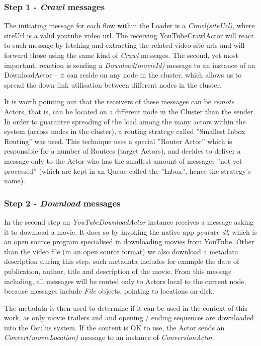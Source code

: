 \subsubsection{Step 1 - \textit{Crawl} messages}
The initiating message for each flow within the Loader is a \textit{Crawl(siteUrl)}, where siteUrl is a valid youtube video url.
The receiving YouTubeCrawlActor will react to such message by fetching and extracting the related video site urls and will forward those using the same kind of \textit{Crawl} messages. The second, yet most important, reaction is sending a \textit{Download(movieId)} message to an instance of an DownloadActor -- it  can reside on any node in the cluster, which allows us to spread the down-link utilisation between different nodes in the cluster.

It is worth pointing out that the receivers of these messages can be \textit{remote} Actors, that is, can be located on a different node in the Cluster than the sender. In order to guarantee spreading of the load among the many actors within the system (across nodes in the cluster), a routing strategy called ''Smallest Inbox Routing'' was used. This technique uses a special ''Router Actor'' which is responsible for a number of Routees (target Actors), and decides to deliver a message only to the Actor who has the smallest amount of messages ''not yet processed'' (which are kept in an Queue called the ''Inbox'', hence the strategy's name).

\subsubsection{Step 2 - \textit{Download} messages}
In the second step an \textit{YouTubeDownloadActor} instance receives a message asking it to download a movie.
It does so by invoking the native app \textit{youtube-dl}, which is an open source program specialised in downloading movies from YouTube.
Other than the video file (in an open source format) we also download a metadata description during this step, such metadata includes for example the date of publication, author, title and description of the movie. From this message including, all messages will be routed only to Actors local to the current node, because messages include \textit{File} objects, pointing to locations on-disk.

The metadata is then used to determine if it can be used in the context of this work, as only movie trailers and and opening / ending sequences are downloaded into the Oculus system. If the content is OK to use, the Actor sends an \textit{Convert(movieLocation)} message to an instance of \textit{ConversionActor}.

